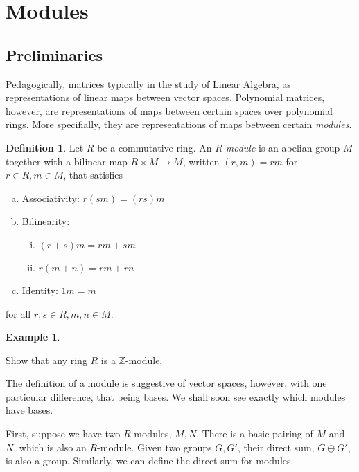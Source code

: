 \documentclass{amsart}
\theoremstyle{definition}
\newtheorem{definition}[theorem]{Definition}
\newtheorem{example}[theorem]{Example}
\theoremstyle{remark}
\numberwithin{equation}{section}
\begin{document}
\section{Modules}

\subsection{Preliminaries}

Pedagogically, matrices typically in the study of Linear Algebra, as representations of linear maps between vector spaces. Polynomial matrices, however, are representations of maps between certain spaces over polynomial rings. More specifially, they are representations of maps between certain \emph{modules}.

\begin{definition}
  Let $R$ be a commutative ring. An \emph{$R$-module} is an abelian group $M$ together with a bilinear map $R \times M \to M$, written $(r, m) = rm$ for $r \in R, m \in M$, that satisfies
  \begin{enumerate}[(a)]
  \item Associativity: $r(sm) = (rs)m$
  \item Bilinearity:
    \begin{enumerate}[(i)]
    \item $(r + s)m = rm + sm$
    \item $r(m + n) = rm + rn$
    \end{enumerate}
  \item Identity: $1m = m$
  \end{enumerate}
  for all $r, s \in R, m, n \in M$.
\end{definition}

\begin{example}
  \begin{aroundtodo}
    Show that any ring $R$ is a $\mathbb{Z}$-module.
  \end{aroundtodo}
\end{example}

The definition of a module is suggestive of vector spaces, however, with one particular difference, that being bases. We shall soon see exactly which modules have bases.

First, suppose we have two $R$-modules, $M, N$. There is a basic pairing of $M$ and $N$, which is also an $R$-module. Given two groups $G, G'$, their direct sum, $G \oplus G'$, is also a group. Similarly, we can define the direct sum for modules.
\end{document}

